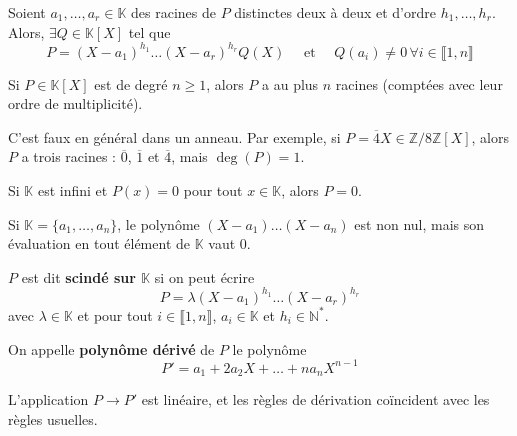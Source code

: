   \begin{proposition}
    Soient $a_1, \dots, a_r \in \mathbb{K}$ des racines de $P$ distinctes deux à deux et d'ordre $h_1, \dots, h_r$. Alors, $\exists Q \in \mathbb{K}[X]$ tel que
    \[ P = (X-a_1)^{h_1} \dots (X-a_r)^{h_r} Q(X) \quad \text{ et } \quad Q(a_i) \neq 0 \, \forall i \in \llbracket 1, n \rrbracket \]
  \end{proposition}

  \begin{corollary}
    Si $P \in \mathbb{K}[X]$ est de degré $n \geq 1$, alors $P$ a au plus $n$ racines (comptées avec leur ordre de multiplicité).
  \end{corollary}

  \begin{cexample}
    C'est faux en général dans un anneau. Par exemple, si $P = \overline{4}X \in \mathbb{Z}/8\mathbb{Z}[X]$, alors $P$ a trois racines : $\overline{0}$, $\overline{1}$ et $\overline{4}$, mais $\deg(P) = 1$.
  \end{cexample}

  \begin{proposition}
    Si $\mathbb{K}$ est infini et $P(x) = 0$ pour tout $x \in \mathbb{K}$, alors $P = 0$.
  \end{proposition}

  \begin{cexample}
    Si $\mathbb{K} = \{ a_1, \dots, a_n \}$, le polynôme $(X-a_1) \dots (X-a_n)$ est non nul, mais son évaluation en tout élément de $\mathbb{K}$ vaut $0$.
  \end{cexample}

  \begin{definition}
    $P$ est dit \textbf{scindé sur $\mathbb{K}$} si on peut écrire
    \[ P = \lambda (X-a_1)^{h_1} \dots (X-a_r)^{h_r} \]
    avec $\lambda \in \mathbb{K}$ et pour tout $i \in \llbracket 1, n \rrbracket$, $a_i \in \mathbb{K}$ et $h_i \in \mathbb{N}^*$.
  \end{definition}

  \begin{definition}
    On appelle \textbf{polynôme dérivé} de $P$ le polynôme
    \[ P' = a_1 + 2a_2 X + \dots + na_n X^{n-1} \]
  \end{definition}

  \begin{remark}
    L'application $P \rightarrow P'$ est linéaire, et les règles de dérivation coïncident avec les règles usuelles.
  \end{remark}

